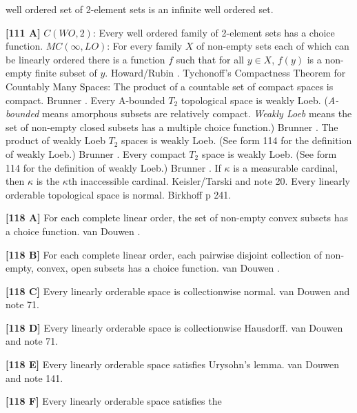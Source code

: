 well ordered set of 2-element sets is an infinite well ordered set.
\smallskip
\item{}{\bf [111 A]} $C(WO,2)$: Every well ordered family of 2-element
sets has a choice function.
\medskip
{} $MC(\infty,LO)$: For every family $X$ of non-empty
sets each of which can be linearly ordered there is a function $f$ such
that for all $y\in X$, $f(y)$ is a non-empty finite subset of $y$.
\ac{Howard/Rubin} \cite{1977}.
\medskip
{} Tychonoff's Compactness Theorem for Countably Many
Spaces: The product of a countable set of compact spaces is compact.
\ac{Brunner} \cite{1985a}. 
\medskip
{} Every A-bounded $T_2$ topological space is weakly
Loeb. ({\it A-bounded} means amorphous subsets are relatively compact.
{\it Weakly Loeb} means the set of non-empty closed subsets
has a multiple choice function.) \ac{Brunner} \cite{1985a}.
\medskip
{} The product of weakly Loeb $T_2$ spaces is weakly
Loeb. (See form 114 for the definition of weakly Loeb.) \ac{Brunner}
\cite{1985a}.
\medskip
{}  Every compact $T_2$ space is weakly  Loeb. (See
form 114 for the definition of weakly Loeb.)  \ac{Brunner} \cite{1985a}.
\medskip
{}  If $\kappa$ is a measurable cardinal,
then $\kappa$ is the $\kappa$th inaccessible cardinal. \ac{Keisler/Tarski}
\cite{1964} and note 20.
\medskip
{}  Every linearly orderable topological space is
normal.  \ac{Birkhoff} \cite{1967} p 241.
\smallskip
\item{}{\bf [118 A]}  For each complete linear order, the set of non-empty
convex subsets has a choice function.  van \ac{Douwen} \cite{1985}.
\smallskip
\item{}{\bf [118 B]}  For each complete linear order, each pairwise
disjoint collection of non-empty, convex, open  subsets has a choice
function.  van \ac{Douwen} \cite{1985}.
\smallskip
\item{}{\bf [118 C]}   Every linearly orderable space is collectionwise
normal.  van \ac{Douwen} \cite{1985} and note 71.
\smallskip
\item{}{\bf [118 D]}   Every linearly orderable space is collectionwise
Hausdorff.  van \ac{Douwen} \cite{1985} and note 71.
\smallskip
\item{}{\bf [118 E]}   Every linearly  orderable space satisfies Urysohn's
lemma.  van \ac{Douwen} \cite{1985} and note 141.
\smallskip
\item{}{\bf [118 F]}  Every linearly orderable space satisfies the
